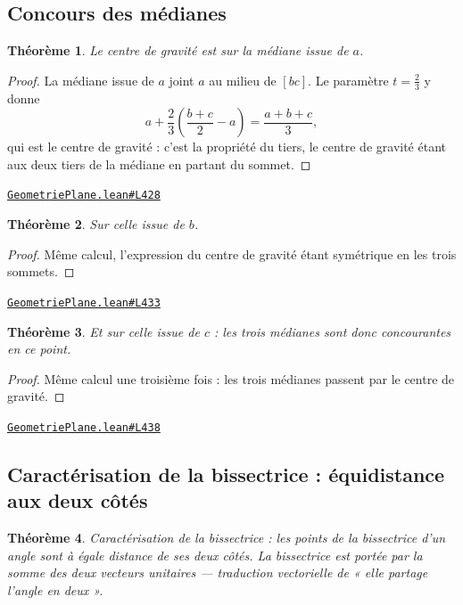 \documentclass[11pt,a4paper]{article}
\theoremstyle{definition}
\theoremstyle{plain}
\newtheorem{theoreme}{Théorème}
\newcommand{\source}[2]{\par\smallskip\noindent\hfill{\footnotesize\href{#1}{\texttt{#2}}}\par\smallskip}
\begin{document}
\subsection{Concours des médianes}

\begin{theoreme}
Le centre de gravité est sur la médiane issue de $a$.
\end{theoreme}

\begin{proof}
La médiane issue de $a$ joint $a$ au milieu de $[bc]$. Le paramètre $t = \tfrac23$ y
donne
\[ a + \frac{2}{3}\left(\frac{b+c}{2} - a\right) = \frac{a+b+c}{3} , \]
qui est le centre de gravité : c'est la propriété du tiers, le centre de gravité étant aux
deux tiers de la médiane en partant du sommet.
\end{proof}
\source{https://github.com/Commutator-IO/learn-lean/blob/main/cours/01-college/02-geometrie-plane/GeometriePlane.lean\#L428}{GeometriePlane.lean\#L428}

\begin{theoreme}
Sur celle issue de $b$.
\end{theoreme}

\begin{proof}
Même calcul, l'expression du centre de gravité étant symétrique en les trois sommets.
\end{proof}
\source{https://github.com/Commutator-IO/learn-lean/blob/main/cours/01-college/02-geometrie-plane/GeometriePlane.lean\#L433}{GeometriePlane.lean\#L433}

\begin{theoreme}
Et sur celle issue de $c$ : les trois médianes sont donc concourantes en ce point.
\end{theoreme}

\begin{proof}
Même calcul une troisième fois : les trois médianes passent par le centre de gravité.
\end{proof}
\source{https://github.com/Commutator-IO/learn-lean/blob/main/cours/01-college/02-geometrie-plane/GeometriePlane.lean\#L438}{GeometriePlane.lean\#L438}

\subsection{Caractérisation de la bissectrice : équidistance aux deux côtés}

\begin{theoreme}
Caractérisation de la bissectrice : les points de la bissectrice d'un angle sont à
égale distance de ses deux côtés. La bissectrice est portée par la somme des deux vecteurs
unitaires — traduction vectorielle de « elle partage l'angle en deux ».
\end{theoreme}
\end{document}
